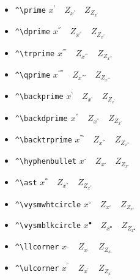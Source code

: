 \begin{itemize}
\item \verb+^\prime+ $x^\prime\quad Z_{x^\prime}\quad Z_{Z_{x^\prime}}$
\item \verb+^\dprime+ $x^\dprime\quad Z_{x^\dprime}\quad Z_{Z_{x^\dprime}}$
\item \verb+^\trprime+ $x^\trprime\quad Z_{x^\trprime}\quad Z_{Z_{x^\trprime}}$
\item \verb+^\qprime+ $x^\qprime\quad Z_{x^\qprime}\quad Z_{Z_{x^\qprime}}$
\item \verb+^\backprime+ $x^\backprime\quad Z_{x^\backprime}\quad Z_{Z_{x^\backprime}}$
\item \verb+^\backdprime+ $x^\backdprime\quad Z_{x^\backdprime}\quad Z_{Z_{x^\backdprime}}$
\item \verb+^\backtrprime+ $x^\backtrprime\quad Z_{x^\backtrprime}\quad Z_{Z_{x^\backtrprime}}$
\item \verb+^\hyphenbullet+ $x^\hyphenbullet\quad Z_{x^\hyphenbullet}\quad Z_{Z_{x^\hyphenbullet}}$
\item \verb+^\ast+ $x^\ast\quad Z_{x^\ast}\quad Z_{Z_{x^\ast}}$
\item \verb+^\vysmwhtcircle+ $x^\vysmwhtcircle\quad Z_{x^\vysmwhtcircle}\quad Z_{Z_{x^\vysmwhtcircle}}$
\item \verb+^\vysmblkcircle+ $x^\vysmblkcircle\quad Z_{x^\vysmblkcircle}\quad Z_{Z_{x^\vysmblkcircle}}$
\item \verb+^\llcorner+ $x^\llcorner\quad Z_{x^\llcorner}\quad Z_{Z_{x^\llcorner}}$
\item \verb+^\ulcorner+ $x^\ulcorner\quad Z_{x^\ulcorner}\quad Z_{Z_{x^\ulcorner}}$
\end{itemize}


